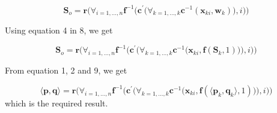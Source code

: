 \documentclass[12pt,a4paper]{article}
\begin{document}
\begin{equation}
\textbf{S}_o = \textbf{r}\Bigg(\forall_{i=1,\dots,n} \textbf{f}^{-1}\bigg(\textbf{c}^\prime\Big(\forall_{k=1,\dots,k}	 \textbf{c}^{-1}(\textbf{x}_{ki}, \textbf{w}_k)\Big), i\bigg)\Bigg)
\end{equation}

Using equation 4 in 8, we get

\begin{equation}
\textbf{S}_o = \textbf{r}\Bigg(\forall_{i=1,\dots,n}	 \textbf{f}^{-1}\bigg(\textbf{c}^\prime\bigg(\forall_{k=1,\dots,k}	 \textbf{c}^{-1}\Big(\textbf{x}_{ki}, \textbf{f}(\textbf{S}_k, 1)\Big)\bigg), i\bigg)\Bigg)
\end{equation}

From equation 1, 2 and 9, we get

\begin{equation}
\langle \textbf{p},\textbf{q} \rangle = \textbf{r}\Bigg(\forall_{i=1,\dots,n}	 \textbf{f}^{-1}\bigg(\textbf{c}^\prime\bigg(\forall_{k=1,\dots,k}	 \textbf{c}^{-1}\Big(\textbf{x}_{ki}, \textbf{f}(\langle \textbf{p}_k,\textbf{q}_k \rangle, 1)\Big)\bigg), i\bigg)\Bigg)
\end{equation}
which is the required result.
\end{document}
